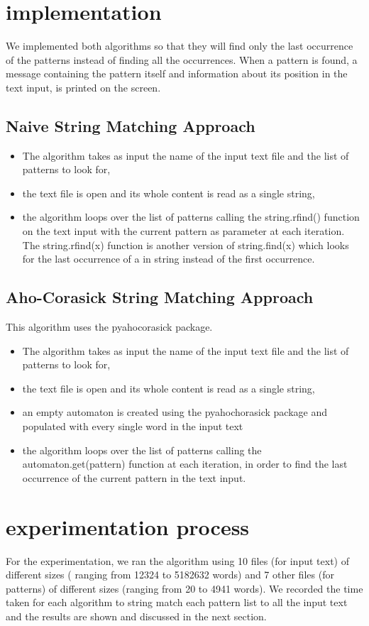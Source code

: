 \documentclass[12pt]{article}
\begin{document}
	\section{implementation}
		We implemented both algorithms so that they will find only the last occurrence of the patterns instead of finding all the occurrences. When a pattern is found, a message containing the pattern itself and information about its position in the text input, is printed on the screen. 
		\subsection{Naive String Matching Approach}
			\begin{itemize}
				\item The algorithm takes as input the name of the input text file and the list of patterns to look for,
				\item the text file is open and its whole content is read as a single string, 
				\item the algorithm loops over the list of patterns calling the string.rfind() function on the text input with the current pattern as parameter at each iteration. The string.rfind(x) function is another version of string.find(x) which looks for the last occurrence of a in string instead of the first occurrence.
			\end{itemize}
		
		\subsection{Aho-Corasick String Matching Approach}
			This algorithm uses the pyahocorasick package. 
			\begin{itemize}
				\item The algorithm takes as input the name of the input text file and the list of patterns to look for,
				\item the text file is open and its whole content is read as a single string,
				\item an empty automaton is created using the pyahochorasick package and populated with every single word in the input text
				\item the algorithm loops over the list of patterns calling the automaton.get(pattern) function at each iteration, in order to find the last occurrence of the current pattern in the text input.
			\end{itemize}
			  
		
	\section {experimentation process}
		For the experimentation, we ran the algorithm using 10 files (for input text) of different sizes ( ranging from 12324 to 5182632 words) and 7 other files (for patterns) of different sizes (ranging from 20 to 4941 words). We recorded the time taken for each algorithm to string match each pattern list to all the input text and the results are shown and discussed in the next section. 
	
\end{document}
